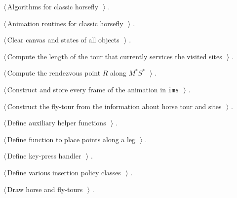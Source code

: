 \documentclass[11.5pt]{report}
\begin{document}
{\small\begin{list}{}{\setlength{\itemsep}{-\parsep}\setlength{\itemindent}{-\leftmargin}}
\item $\langle\,$Algorithms for classic horsefly\nobreak\ {\footnotesize {}}$\,\rangle$ {\footnotesize {\NWtxtRefIn} .}
\item $\langle\,$Animation routines for classic horsefly\nobreak\ {\footnotesize {}}$\,\rangle$ {\footnotesize {\NWtxtRefIn} .}
\item $\langle\,$Clear canvas and states of all objects\nobreak\ {\footnotesize {}}$\,\rangle$ {\footnotesize {\NWtxtRefIn} .}
\item $\langle\,$Compute the length of the tour that currently services the visited sites\nobreak\ {\footnotesize {}}$\,\rangle$ {\footnotesize {\NWtxtRefIn} .}
\item $\langle\,$Compute the rendezvous point $R$ along $M^{*}S^{*}$\nobreak\ {\footnotesize {}}$\,\rangle$ {\footnotesize {\NWtxtNoRef}.}
\item $\langle\,$Construct and store every frame of the animation in \verb|ims|\nobreak\ {\footnotesize {}}$\,\rangle$ {\footnotesize {\NWtxtRefIn} .}
\item $\langle\,$Construct the fly-tour from the information about horse tour and sites\nobreak\ {\footnotesize {}}$\,\rangle$ {\footnotesize {\NWtxtRefIn} .}
\item $\langle\,$Define auxiliary helper functions\nobreak\ {\footnotesize {}}$\,\rangle$ {\footnotesize {\NWtxtRefIn} .}
\item $\langle\,$Define function to place points along a leg\nobreak\ {\footnotesize {}}$\,\rangle$ {\footnotesize {\NWtxtRefIn} .}
\item $\langle\,$Define key-press handler\nobreak\ {\footnotesize {}}$\,\rangle$ {\footnotesize {\NWtxtRefIn} .}
\item $\langle\,$Define various insertion policy classes\nobreak\ {\footnotesize {}}$\,\rangle$ {\footnotesize {\NWtxtRefIn} .}
\item $\langle\,$Draw horse and fly-tours\nobreak\ {\footnotesize {}}$\,\rangle$ {\footnotesize {\NWtxtRefIn} .}

\end{list}}
\end{document}
